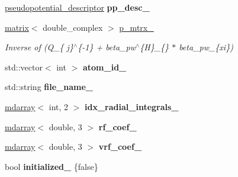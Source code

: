 \begin{DoxyCompactItemize}
\item 
\hypertarget{classsirius_1_1_atom__type_ab75cda8719b160536b1afe4e63ab0239}{}\hyperlink{structpseudopotential__descriptor}{pseudopotential\+\_\+descriptor} {\bfseries pp\+\_\+desc\+\_\+}\label{classsirius_1_1_atom__type_ab75cda8719b160536b1afe4e63ab0239}

\item 
\hyperlink{classsddk_1_1mdarray}{matrix}$<$ double\+\_\+complex $>$ \hyperlink{classsirius_1_1_atom__type_ab6a5196906a65c23cc6ef5890f262502}{p\+\_\+mtrx\+\_\+}
\begin{DoxyCompactList}\small\item\em Inverse of (Q\+\_\+\{ \textquotesingle{}j\}$^\wedge$\{-\/1\} + beta\+\_\+pw$^\wedge$\{H\}\+\_\+\{\} $\ast$ beta\+\_\+pw\+\_\+\{xi\textquotesingle{}\}) \end{DoxyCompactList}\item 
\hypertarget{classsirius_1_1_atom__type_aa4705d21a598ef8cbf693f3e4f8c4adb}{}std\+::vector$<$ int $>$ {\bfseries atom\+\_\+id\+\_\+}\label{classsirius_1_1_atom__type_aa4705d21a598ef8cbf693f3e4f8c4adb}

\item 
\hypertarget{classsirius_1_1_atom__type_ac2844525d5dc25f5e0987e1799418b85}{}std\+::string {\bfseries file\+\_\+name\+\_\+}\label{classsirius_1_1_atom__type_ac2844525d5dc25f5e0987e1799418b85}

\item 
\hypertarget{classsirius_1_1_atom__type_a723293476b8170a0edcfee42da331a76}{}\hyperlink{classsddk_1_1mdarray}{mdarray}$<$ int, 2 $>$ {\bfseries idx\+\_\+radial\+\_\+integrals\+\_\+}\label{classsirius_1_1_atom__type_a723293476b8170a0edcfee42da331a76}

\item 
\hypertarget{classsirius_1_1_atom__type_a48c9882504afdd5de0b5dc09bd1eb4ba}{}\hyperlink{classsddk_1_1mdarray}{mdarray}$<$ double, 3 $>$ {\bfseries rf\+\_\+coef\+\_\+}\label{classsirius_1_1_atom__type_a48c9882504afdd5de0b5dc09bd1eb4ba}

\item 
\hypertarget{classsirius_1_1_atom__type_ab32a919f44ac47f97b3ff8419c248551}{}\hyperlink{classsddk_1_1mdarray}{mdarray}$<$ double, 3 $>$ {\bfseries vrf\+\_\+coef\+\_\+}\label{classsirius_1_1_atom__type_ab32a919f44ac47f97b3ff8419c248551}

\item 
\hypertarget{classsirius_1_1_atom__type_ab7d458a75f6763fd0e4f50022b3a5353}{}bool {\bfseries initialized\+\_\+} \{false\}\label{classsirius_1_1_atom__type_ab7d458a75f6763fd0e4f50022b3a5353}

\end{DoxyCompactItemize}


